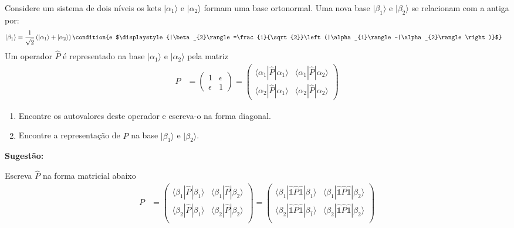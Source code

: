 
	 \begin{prob}
		 Considere um sistema de dois níveis os kets $|\alpha_{1}\rangle$ e $|\alpha_{2}\rangle$ formam uma base ortonormal. Uma nova base $|\beta_{1}\rangle$ e $|\beta_{2}\rangle$ se relacionam com a antiga por:
		 \begin{align}
			 |\beta_{1}\rangle &= \frac{1}{\sqrt{2}}\left(|\alpha_{1}\rangle+|\alpha_{2}\rangle\right)\condition{e $\displaystyle{|\beta_{2}\rangle=\frac{1}{\sqrt{2}}\left(|\alpha_{1}\rangle-|\alpha_{2}\rangle\right)}$}
		 \end{align}
		 Um operador $\hat{P}$ é representado na base $|\alpha_{1}\rangle$ e $|\alpha_{2}\rangle$ pela matriz
		 \begin{align}
			 P &= 
			 \begin{pmatrix}
				 1 & \epsilon \\
				 \epsilon & 1
			 \end{pmatrix}
			 =
			 \begin{pmatrix}
				 \langle \alpha_{1}|\hat{P}|\alpha_{1}\rangle & \langle \alpha_{1}|\hat{P}|\alpha_{2}\rangle \\
				 \langle \alpha_{2}|\hat{P}|\alpha_{1}\rangle & \langle \alpha_{2}|\hat{P}|\alpha_{2}\rangle
			 \end{pmatrix}
		 \end{align}
		 \begin{enumerate}[label=\alph *)]
			 \item Encontre os autovalores deste operador e escreva-o na forma diagonal.
			 \item Encontre a representação de $\hat{P}$ na base $|\beta_{1}\rangle$ e $|\beta_{2}\rangle$.
		 \end{enumerate}

		 \textbf{Sugestão:}

		 Escreva $\hat{P}$ na forma matricial abaixo
		 \begin{align}
			 P &=
			 \begin{pmatrix}
				 \langle \beta_{1}|\hat{P}|\beta_{1}\rangle & \langle \beta_{1}|\hat{P}|\beta_{2}\rangle \\
				 \langle \beta_{2}|\hat{P}|\beta_{1}\rangle & \langle \beta_{2}|\hat{P}|\beta_{2}\rangle \\
			 \end{pmatrix}
			 =
			 \begin{pmatrix}
				 \langle \beta_{1}|\mathbb{\hat{1}}\hat{P}\mathbb{\hat{1}}|\beta_{1}\rangle & \langle \beta_{1}|\mathbb{\hat{1}}\hat{P}\mathbb{\hat{1}}|\beta_{2}\rangle \\
				 \langle \beta_{2}|\mathbb{\hat{1}}\hat{P}\mathbb{\hat{1}}|\beta_{\hat{1}}\rangle & \langle \beta_{2}|\mathbb{\hat{1}}\hat{P}\mathbb{\hat{1}}|\beta_{2}\rangle \\
			 \end{pmatrix}
		 \end{align}


\end{prob}

